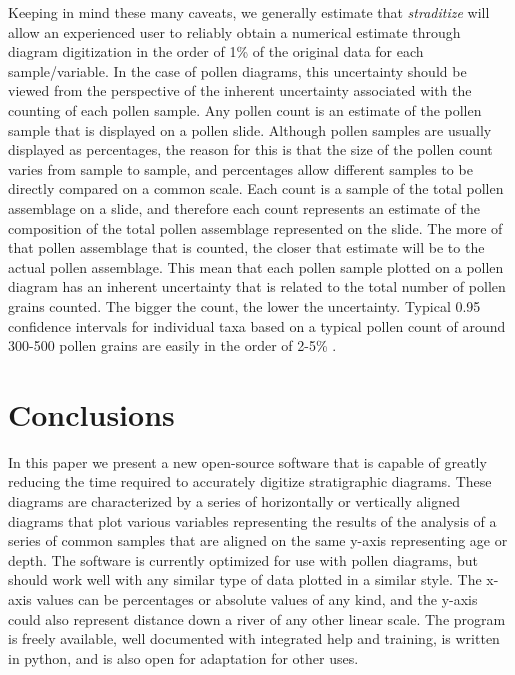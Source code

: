 \documentclass[
11pt, %
english, %
singlespacing, %
headsepline, %
]{MastersDoctoralThesis} %
\begin{document}
\begin{NoHyper}
\begin{refsection}
Keeping in mind these many caveats, we generally estimate that \emph{straditize} will allow an experienced user to reliably obtain a numerical estimate through diagram digitization in the order of 1\% of the original data for each sample/variable. In the case of pollen diagrams, this uncertainty should be viewed from the perspective of the inherent uncertainty associated with the counting of each pollen sample. Any pollen count is an estimate of the pollen sample that is displayed on a pollen slide. Although pollen samples are usually displayed as percentages, the reason for this is that the size of the pollen count varies from sample to sample, and percentages allow different samples to be directly compared on a common scale. Each count is a sample of the total pollen assemblage on a slide, and therefore each count represents an estimate of the composition of the total pollen assemblage represented on the slide. The more of that pollen assemblage that is counted, the closer that estimate will be to the actual pollen assemblage. This mean that each pollen sample plotted on a pollen diagram has an inherent uncertainty that is related to the total number of pollen grains counted. The bigger the count, the lower the uncertainty. Typical 0.95 confidence intervals for individual taxa based on a typical pollen count of around 300-500 pollen grains are easily in the order of 2-5\% \citep{Maher1972}.

\section{Conclusions}  \label{sec:straditize-conclusions}
In this paper we present a new open-source software that is capable of greatly reducing the time required to accurately digitize stratigraphic diagrams. These diagrams are characterized by a series of horizontally or vertically aligned diagrams that plot various variables representing the results of the analysis of a series of common samples that are aligned on the same y-axis representing age or depth. The software is currently optimized for use with pollen diagrams, but should work well with any similar type of data plotted in a similar style. The x-axis values can be percentages or absolute values of any kind, and the y-axis could also represent distance down a river of any other linear scale. The program is freely available, well documented with integrated help and training, is written in python, and is also open for adaptation for other uses. 

\printbibliography[heading=subbibintoc]


\end{refsection}
\end{NoHyper}
\end{document}
